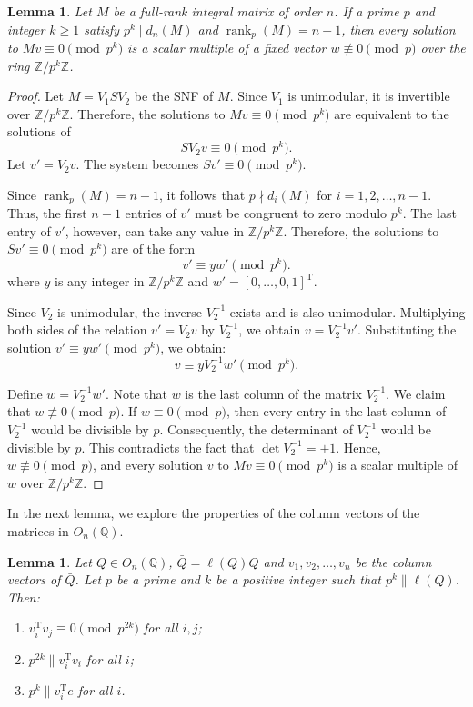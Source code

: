 \documentclass[12pt]{article}
\theoremstyle{plain}
\newtheorem{lemma}[theorem]{Lemma}
\theoremstyle{definition}
\newcommand{\trans}{^{\mathrm{T}}}
\begin{document}
\begin{lemma}
\label{lemma:rank-1}
Let $M$ be a full-rank integral matrix of order $n$. If a prime $p$ and integer $k\ge 1$ satisfy $p^k \mid d_n(M)$ and $\operatorname{rank}_p(M)=n-1$, then every solution to $M v \equiv 0 \pmod{p^k}$ is a scalar multiple of a fixed vector $w \not\equiv 0 \pmod{p}$ over the ring $\mathbb{Z}/p^k\mathbb{Z}$.
\end{lemma}
\begin{proof}
Let $M = V_1 S V_2$ be the SNF of $M$. Since $V_1$ is unimodular, it is invertible over $\mathbb{Z}/p^k\mathbb{Z}$. Therefore, the solutions to $M v \equiv 0 \pmod{p^k}$ are equivalent to the solutions of
$$S V_2 v \equiv 0 \pmod{p^k}.$$
Let $v' = V_2 v$. The system becomes $S v' \equiv 0 \pmod{p^k}$.

Since $\operatorname{rank}_p(M)=n-1$, it follows that $p \nmid d_i(M)$ for $i = 1, 2, \ldots, n-1$. Thus, the first $n-1$ entries of $v'$ must be congruent to zero modulo $p^k$. The last entry of $v'$, however, can take any value in $\mathbb{Z}/p^k\mathbb{Z}$. Therefore, the solutions to $S v' \equiv 0 \pmod{p^k}$ are of the form
\begin{equation*}
v' \equiv y w' \pmod{p^k}.
\end{equation*}
where $y$ is any integer in $\mathbb{Z}/p^k\mathbb{Z}$ and $w' = [0, \dots, 0, 1]\trans$.

Since $V_2$ is unimodular, the inverse $V_2^{-1}$ exists and is also unimodular. Multiplying both sides of the relation $v' = V_2 v$ by $V_2^{-1}$, we obtain $v = V_2^{-1} v'$. Substituting the solution $v' \equiv y w' \pmod{p^k}$, we obtain:
$$v \equiv y V_2^{-1} w' \pmod{p^k}.$$

Define $w = V_2^{-1} w'$. Note that $w$ is the last column of the matrix $V_2^{-1}$. We claim that $w \not\equiv 0 \pmod p$. If $w \equiv 0 \pmod p$, then every entry in the last column of $V_2^{-1}$ would be divisible by $p$. Consequently, the determinant of $V_2^{-1}$ would be divisible by $p$. This contradicts the fact that $\det{V_2^{-1}} = \pm 1$. Hence, $w \not\equiv 0 \pmod p$, and every solution $v$ to $M v \equiv 0 \pmod{p^k}$ is a scalar multiple of $w$ over $\mathbb{Z}/p^k\mathbb{Z}$.
\end{proof}

In the next lemma, we explore the properties of the column vectors of the matrices in $O_n(\mathbb{Q})$.

\begin{lemma}
\label{lemma:q-props}
Let $Q \in O_n(\mathbb{Q})$, $\bar{Q} = \ell(Q)Q$ and $v_1, v_2, \dots, v_n$ be the column vectors of $\bar{Q}$. Let $p$ be a prime and $k$ be a positive integer such that $p^k \parallel \ell(Q)$. Then:
\begin{enumerate}
\item $v_i\trans v_j \equiv 0 \pmod{p^{2k}}$ for all $i, j$;
\item $p^{2k} \parallel v_i\trans v_i$ for all $i$;
\item $p^{k} \parallel v_i\trans e$ for all $i$.
\end{enumerate} 
\end{lemma}
\end{document}
